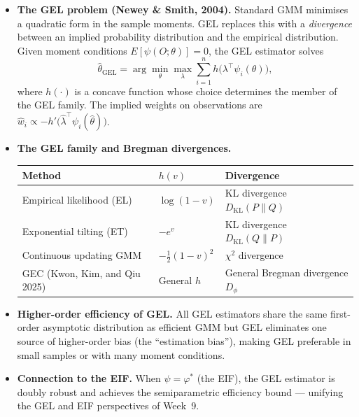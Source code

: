 \documentclass[12pt]{article}
\begin{document}
\begin{itemize}
  \item \textbf{The GEL problem (Newey \& Smith, 2004).}
    Standard GMM minimises a quadratic form in the sample moments.
    GEL replaces this with a \emph{divergence} between an implied
    probability distribution and the empirical distribution.  Given
    moment conditions $E[\psi(O;\theta)] = 0$, the GEL estimator solves
    \[
      \hat\theta_{\mathrm{GEL}}
      = \arg\min_\theta \max_\lambda
        \sum_{i=1}^n h\!\bigl(\lambda^\top \psi_i(\theta)\bigr),
    \]
    where $h(\cdot)$ is a concave function whose choice determines
    the member of the GEL family.  The implied weights on observations
    are $\hat w_i \propto -h'\!\bigl(\hat\lambda^\top \psi_i(\hat\theta)\bigr)$.

  \item \textbf{The GEL family and Bregman divergences.}
    \begin{center}
    \renewcommand{\arraystretch}{1.4}
    \small
    \begin{tabular}{@{}lll@{}}
      \toprule
      \textbf{Method} & \textbf{$h(v)$} & \textbf{Divergence} \\
      \midrule
      Empirical likelihood (EL)
        & $\log(1 - v)$ & KL divergence $D_{\mathrm{KL}}(P \| Q)$ \\
      Exponential tilting (ET)
        & $-e^v$ & KL divergence $D_{\mathrm{KL}}(Q \| P)$ \\
      Continuous updating GMM
        & $-\tfrac{1}{2}(1-v)^2$ & $\chi^2$ divergence \\
      GEC (Kwon, Kim, and Qiu 2025)
        & General $h$ & General Bregman divergence $D_\phi$ \\
      \bottomrule
    \end{tabular}
    \end{center}

  \item \textbf{Higher-order efficiency of GEL.}
    All GEL estimators share the same first-order asymptotic distribution
    as efficient GMM but GEL eliminates one source of higher-order bias
    (the ``estimation bias''), making GEL preferable in small samples or
    with many moment conditions.

  \item \textbf{Connection to the EIF.}
    When $\psi = \varphi^*$ (the EIF), the GEL estimator is doubly robust
    and achieves the semiparametric efficiency bound --- unifying the GEL
    and EIF perspectives of Week~9.


\end{itemize}
\end{document}
